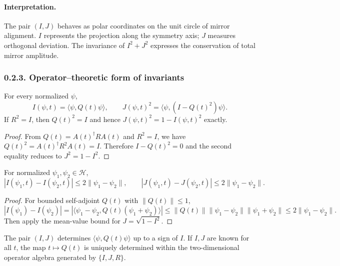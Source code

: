 \paragraph{Interpretation.}
The pair $(I,J)$ behaves as polar coordinates on the unit circle of mirror alignment.
$I$ represents the projection along the symmetry axis; $J$ measures orthogonal deviation.
The invariance of $I^2+J^2$ expresses the conservation of total mirror amplitude.

\subsubsection*{0.2.3. Operator–theoretic form of invariants}

\begin{theorem}
For every normalized $\psi$,
\[
I(\psi,t)=\langle\psi,Q(t)\psi\rangle,\qquad
J(\psi,t)^2=\langle\psi,(I-Q(t)^2)\psi\rangle.
\]
If $R^2=I$, then $Q(t)^2=I$ and hence $J(\psi,t)^2=1-I(\psi,t)^2$ exactly.
\end{theorem}

\begin{proof}
From $Q(t)=A(t)^\dagger R A(t)$ and $R^2=I$, we have $Q(t)^2=A(t)^\dagger R^2 A(t)=I$.
Therefore $I-Q(t)^2=0$ and the second equality reduces to $J^2=1-I^2$.
\end{proof}

\begin{lemma}
For normalized $\psi_1,\psi_2\in\mathcal{H}$,
\[
|I(\psi_1,t)-I(\psi_2,t)|\le 2\|\psi_1-\psi_2\|,\qquad
|J(\psi_1,t)-J(\psi_2,t)|\le 2\|\psi_1-\psi_2\|.
\]
\end{lemma}

\begin{proof}
For bounded self-adjoint $Q(t)$ with $\|Q(t)\|\le1$,
\[
|I(\psi_1)-I(\psi_2)|
=|\langle\psi_1-\psi_2,Q(t)(\psi_1+\psi_2)\rangle|
\le \|Q(t)\|\|\psi_1-\psi_2\|\|\psi_1+\psi_2\|\le2\|\psi_1-\psi_2\|.
\]
Then apply the mean-value bound for $J=\sqrt{1-I^2}$.
\end{proof}

\begin{theorem}
The pair $(I,J)$ determines $\langle\psi,Q(t)\psi\rangle$ up to a sign of $I$.
If $I,J$ are known for all $t$, the map $t\mapsto Q(t)$ is uniquely determined within the two-dimensional operator algebra generated by $\{I,J,R\}$.
\end{theorem}

